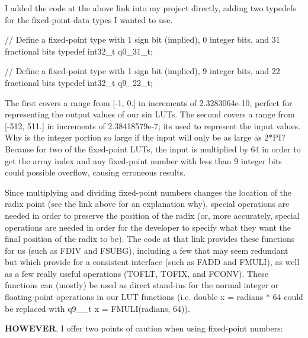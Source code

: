 I added the code at the above link into my project directly, adding two typedefs for the fixed-\/point data types I wanted to use. 
\begin{DoxyCode}
// Define a fixed-point type with 1 sign bit (implied), 0 integer bits, and 31 fractional bits
typedef int32\_t q0\_31\_t;

// Define a fixed-point type with 1 sign bit (implied), 9 integer bits, and 22 fractional bits
typedef int32\_t q9\_22\_t;
\end{DoxyCode}
 The first covers a range from \mbox{[}-\/1, 0.\mbox{]} in increments of 2.\+3283064e-\/10, perfect for representing the output values of our sin L\+U\+Ts. The second covers a range from \mbox{[}-\/512, 511.\mbox{]} in increments of 2.\+38418579e-\/7; it\textquotesingle{}s used to represent the input values. Why is the integer portion so large if the input will only be as large as 2$\ast$\+PI? Because for two of the fixed-\/point L\+U\+Ts, the input is multiplied by 64 in order to get the array index and any fixed-\/point number with less than 9 integer bits could possible overflow, causing erroneous results.

Since multiplying and dividing fixed-\/point numbers changes the location of the radix point (see the link above for an explanation why), special operations are needed in order to preserve the position of the radix (or, more accurately, special operations are needed in order for the developer to specify what they want the final position of the radix to be). The code at that link provides these functions for us (such as {\ttfamily F\+D\+IV} and {\ttfamily F\+S\+U\+BG}), including a few that may seem redundant but which provide for a consistent interface (such as {\ttfamily F\+A\+DD} and {\ttfamily F\+M\+U\+LI}), as well as a few really useful operations ({\ttfamily T\+O\+F\+LT}, {\ttfamily T\+O\+F\+IX}, and {\ttfamily F\+C\+O\+NV}). These functions can (mostly) be used as direct stand-\/ins for the normal integer or floating-\/point operations in our L\+UT functions (i.\+e. {\ttfamily double x = radians $\ast$ 64} could be replaced with {\ttfamily q9\+\_\+\_\+t x = F\+M\+U\+L\+I(radians, 64)}).

{\bfseries H\+O\+W\+E\+V\+ER}, I offer two points of caution when using fixed-\/point numbers\+:



